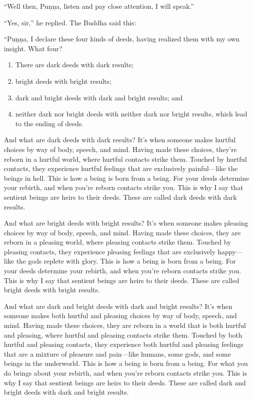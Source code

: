 \documentclass[12pt,openany]{book}%
\begin{document}
“Well then, \textsanskrit{Puṇṇa}, listen and pay close attention, I will speak.” 

“Yes, sir,” he replied. The Buddha said this: 

“\textsanskrit{Puṇṇa}, I declare these four kinds of deeds, having realized them with my own insight. What four? 

\begin{enumerate}%
\item There are dark deeds with dark results; %
\item bright deeds with bright results; %
\item dark and bright deeds with dark and bright results; and %
\item neither dark nor bright deeds with neither dark nor bright results, which lead to the ending of deeds. %
\end{enumerate}

And what are dark deeds with dark results? It’s when someone makes hurtful choices by way of body, speech, and mind. Having made these choices, they’re reborn in a hurtful world, where hurtful contacts strike them. Touched by hurtful contacts, they experience hurtful feelings that are exclusively painful—like the beings in hell. This is how a being is born from a being. For your deeds determine your rebirth, and when you’re reborn contacts strike you. This is why I say that sentient beings are heirs to their deeds. These are called dark deeds with dark results. 

And what are bright deeds with bright results? It’s when someone makes pleasing choices by way of body, speech, and mind. Having made these choices, they are reborn in a pleasing world, where pleasing contacts strike them. Touched by pleasing contacts, they experience pleasing feelings that are exclusively happy—like the gods replete with glory. This is how a being is born from a being. For your deeds determine your rebirth, and when you’re reborn contacts strike you. This is why I say that sentient beings are heirs to their deeds. These are called bright deeds with bright results. 

And what are dark and bright deeds with dark and bright results? It’s when someone makes both hurtful and pleasing choices by way of body, speech, and mind. Having made these choices, they are reborn in a world that is both hurtful and pleasing, where hurtful and pleasing contacts strike them. Touched by both hurtful and pleasing contacts, they experience both hurtful and pleasing feelings that are a mixture of pleasure and pain—like humans, some gods, and some beings in the underworld. This is how a being is born from a being. For what you do brings about your rebirth, and when you’re reborn contacts strike you. This is why I say that sentient beings are heirs to their deeds. These are called dark and bright deeds with dark and bright results. 
\end{document}
